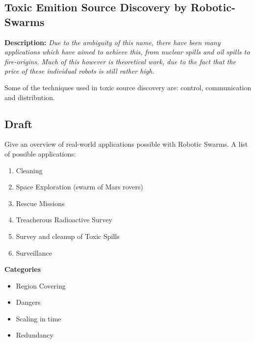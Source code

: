   \subsection{Toxic Emition Source Discovery by Robotic-Swarms}
  \textbf{Description: }\emph{Due to the ambiguity of this name, there have been many applications which have aimed to achieve this, from nuclear spills and oil spills to fire-origins. Much of this however is theoretical work, due to the fact that the price of these individual robots is still rather high.}

  Some of the techniques used in toxic source discovery are: control, communication and distribution.\cite{Li2012}
  
  \subsection{Draft}
  Give an overview of real-world applications possible with Robotic Swarms. A list of possible applications:
    \begin{enumerate}
      \item Cleaning
      \item Space Exploration (swarm of Mars rovers)
      \item Rescue Missions
      \item Treacherous Radioactive Survey
      \item Survey and cleanup of Toxic Spills
      \item Surveillance
    \end{enumerate}
  \textbf{Categories}
    \begin{itemize}
      \item Region Covering
      \item Dangers
      \item Scaling in time
      \item Redundancy
    \end{itemize}
  